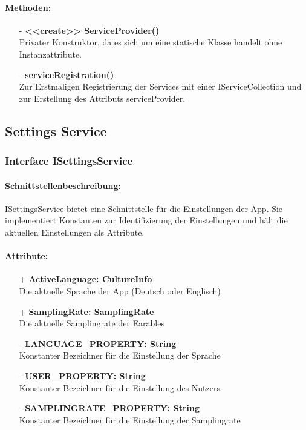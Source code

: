 \documentclass[a4paper,12pt]{article}
\begin{document}
	\paragraph{Methoden:}
	\begin{itemize}
		\item[-] \textbf{<<create>> ServiceProvider()}\\Privater Konstruktor, da es sich um eine statische Klasse handelt ohne Instanzattribute.
		\item[-] \textbf{serviceRegistration()}\\ Zur Erstmaligen Registrierung der Services mit einer IServiceCollection und zur Erstellung des Attributs serviceProvider.\\
	\end{itemize}
		
		
		
		
		
\subsection{Settings Service}
\subsubsection{Interface ISettingsService}
	\paragraph{Schnittstellenbeschreibung:}
	ISettingsService bietet eine Schnittstelle für die Einstellungen der App. Sie implementiert Konstanten zur Identifizierung der Einstellungen und hält die aktuellen Einstellungen als Attribute.
	\paragraph{Attribute:}
	\begin{itemize}
		\item[+] \textbf{ActiveLanguage: CultureInfo}\\Die aktuelle Sprache der App (Deutsch oder Englisch)\\
		\item[+] \textbf{SamplingRate: SamplingRate}\\Die aktuelle Samplingrate der \Gls{Earables} \\ 
		\item[-] \textbf{LANGUAGE\_PROPERTY: String}\\Konstanter Bezeichner für die Einstellung der Sprache \\
		\item[-] \textbf{USER\_PROPERTY: String}\\Konstanter Bezeichner für die Einstellung des Nutzers \\
		\item[-] \textbf{SAMPLINGRATE\_PROPERTY: String}\\Konstanter Bezeichner für die Einstellung der Samplingrate \\
	\end{itemize}
\end{document}

